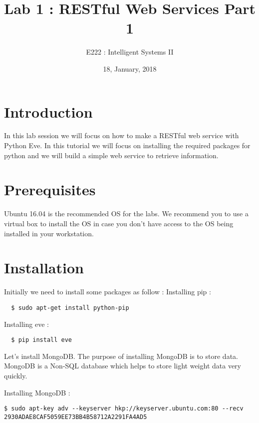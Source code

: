 \documentclass{article}
\title{Lab 1 : RESTful Web Services Part 1}
\author{E222 : Intelligent Systems II }
\date{18, January, 2018}
\begin{document}
\maketitle


\section{Introduction}

In this lab session we will focus on how to make a RESTful web service with Python Eve. In this tutorial we will focus on installing the required packages for python and we will build a simple web service to retrieve information. 

\section{Prerequisites}

Ubuntu 16.04 is the recommended OS for the labs. We recommend you to use a virtual box to install the OS in case you don't have access to the OS being installed in your workstation. 

\section{Installation}

Initially we need to install some packages as follow :
\newline
\noindent  Installing pip :
\begin{verbatim}
  $ sudo apt-get install python-pip
\end{verbatim}


\noindent  Installing eve :
\begin{verbatim}
  $ pip install eve
\end{verbatim}

Let's install MongoDB. The purpose of installing MongoDB is to store data. MongoDB is a Non-SQL database which helps to store light weight data very quickly.


\noindent  Installing MongoDB :

\begin{verbatim}
$ sudo apt-key adv --keyserver hkp://keyserver.ubuntu.com:80 --recv 
2930ADAE8CAF5059EE73BB4B58712A2291FA4AD5
\end{verbatim}
\end{document}

